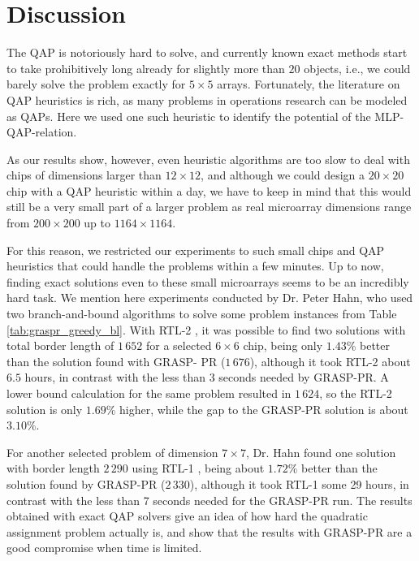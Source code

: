 \section{Discussion}
\label{sec:qap_discussion}

The QAP is notoriously hard to solve, and currently known exact methods start to
take prohibitively long already for slightly more than $20$ objects, i.e., we
could barely solve the problem exactly for $5\times 5$ arrays. Fortunately, the
literature on QAP heuristics is rich, as many problems in operations research
can be modeled as QAPs. Here we used one such heuristic to identify the
potential of the MLP-QAP-relation.

As our results show, however, even heuristic algorithms are too slow to deal
with chips of dimensions larger than $12 \times 12$, and although we could
design a $20 \times 20$ chip with a QAP heuristic within a day, we have to keep
in mind that this would still be a very small part of a larger problem as real
microarray dimensions range from $200 \times 200$ up to $1164 \times 1164$.

For this reason, we restricted our experiments to such small chips and QAP
heuristics that could handle the problems within a few minutes. Up to now,
finding exact solutions even to these small microarrays seems to be an
incredibly hard task. We mention here experiments conducted by Dr. Peter Hahn,
who used two branch-and-bound algorithms to solve some problem instances from
Table \ref{tab:graspr_greedy_bl}. With RTL-2 \citep{Adams}, it was possible to
find two solutions with total border length of $1\,652$ for a selected
$6\times 6$ chip, being only $1.43\%$ better than the solution found with GRASP-
PR ($1\,676$), although it took RTL-2 about $6.5$ hours, in contrast with the
less than 3 seconds needed by GRASP-PR. A lower bound calculation for the same
problem resulted in $1\,624$, so the RTL-2 solution is only $1.69\%$ higher,
while the gap to the GRASP-PR solution is about $3.10\%$.

For another selected problem of dimension $7\times 7$, Dr. Hahn found one
solution with border length $2\,290$ using RTL-1 \citep{Hahn1998}, being about
$1.72\%$ better than the solution found by GRASP-PR ($2\,330$), although it took
RTL-1 some 29 hours, in contrast with the less than 7 seconds needed for the
GRASP-PR run. The results obtained with exact QAP solvers give an idea of how
hard the quadratic assignment problem actually is, and show that the results
with GRASP-PR are a good compromise when time is limited.

